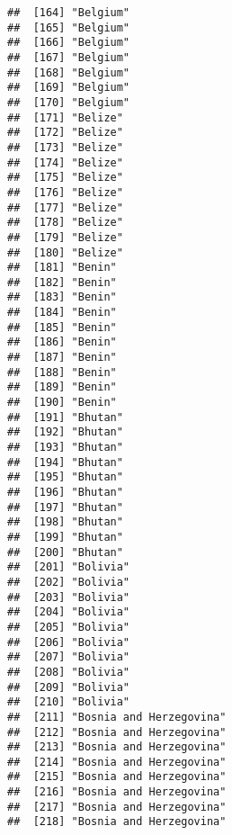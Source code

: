 \documentclass[]{article}
\begin{document}
\begin{verbatim}
##  [164] "Belgium"                            
##  [165] "Belgium"                            
##  [166] "Belgium"                            
##  [167] "Belgium"                            
##  [168] "Belgium"                            
##  [169] "Belgium"                            
##  [170] "Belgium"                            
##  [171] "Belize"                             
##  [172] "Belize"                             
##  [173] "Belize"                             
##  [174] "Belize"                             
##  [175] "Belize"                             
##  [176] "Belize"                             
##  [177] "Belize"                             
##  [178] "Belize"                             
##  [179] "Belize"                             
##  [180] "Belize"                             
##  [181] "Benin"                              
##  [182] "Benin"                              
##  [183] "Benin"                              
##  [184] "Benin"                              
##  [185] "Benin"                              
##  [186] "Benin"                              
##  [187] "Benin"                              
##  [188] "Benin"                              
##  [189] "Benin"                              
##  [190] "Benin"                              
##  [191] "Bhutan"                             
##  [192] "Bhutan"                             
##  [193] "Bhutan"                             
##  [194] "Bhutan"                             
##  [195] "Bhutan"                             
##  [196] "Bhutan"                             
##  [197] "Bhutan"                             
##  [198] "Bhutan"                             
##  [199] "Bhutan"                             
##  [200] "Bhutan"                             
##  [201] "Bolivia"                            
##  [202] "Bolivia"                            
##  [203] "Bolivia"                            
##  [204] "Bolivia"                            
##  [205] "Bolivia"                            
##  [206] "Bolivia"                            
##  [207] "Bolivia"                            
##  [208] "Bolivia"                            
##  [209] "Bolivia"                            
##  [210] "Bolivia"                            
##  [211] "Bosnia and Herzegovina"             
##  [212] "Bosnia and Herzegovina"             
##  [213] "Bosnia and Herzegovina"             
##  [214] "Bosnia and Herzegovina"             
##  [215] "Bosnia and Herzegovina"             
##  [216] "Bosnia and Herzegovina"             
##  [217] "Bosnia and Herzegovina"             
##  [218] "Bosnia and Herzegovina"             

\end{verbatim}
\end{document}
